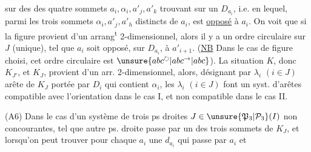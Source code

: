 sur   des  des quatre sommets
$a_i,\alpha_i,a'_j,a'_k$  trouvant sur un $D_{a_i}$,
i.e. en  lequel, parmi les trois
sommets $\alpha_i,a'_j,a'_h$ distincts de $a_i$, est
\uline{opposé} à $a_i$. On voit que si la
figure  provient d'un arrang\textsuperscript{t} 2-dimensionnel,
alors il y a  un ordre circulaire
sur $J$ (unique), tel que $a_i$ soit opposé,
sur $D_{a_i}$, à $a'_{i+1}$. (\uline{NB} Dans le cas
de figure choisi, cet ordre circulaire est
$\unsure{abc^{\circlearrowright}|abc^{\rightarrow}|abc}$).
  
 La situation $K$, donc
$K_{J'}$,  et $K_J$, provient d'un arr. 2-dimensionnel,
alors,  désignant par
$\lambda_i$ $(i\in J)$  arête de $K_J$  portée
par $D_i$ qui contient $\alpha_i$, les $\lambda_i$ $(i\in J)$
font un syst. d'arêtes compatible avec
l'orientation dans le cas I, et non compatible
dans le cas II.

(A6)  Dans le cas d'un système
de trois ps droites $J\in\unsure{\mathfrak P_3|\mathcal P_3}(I)$ non concourantes,
tel que  autre ps. droite passe par un des
trois sommets  de $K_J$, et lorsqu'on peut trouver
pour chaque $a_i$ une $d_{a_i}$ qui passe par $a_i$ et

